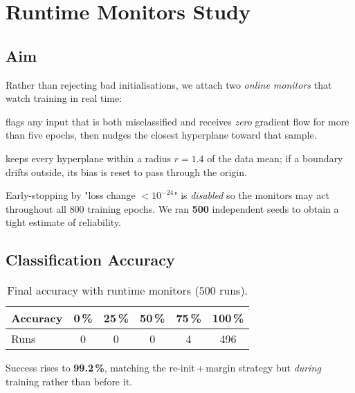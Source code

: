 \section{Runtime Monitors Study}
\label{sec:relu1-monitors}

\subsection*{Aim}
Rather than rejecting bad initialisations, we attach two \emph{online
monitors} that watch training in real time:

\begin{description}[leftmargin=2em,style=sameline]
  \item[DeadSampleMonitor] flags any input that is both misclassified
        and receives \emph{zero} gradient flow for more than five epochs,
        then nudges the closest hyperplane toward that sample.
  \item[BoundsMonitor] keeps every hyperplane within a radius
        $r = 1.4$ of the data mean; if a boundary drifts outside, its
        bias is reset to pass through the origin.
\end{description}

Early-stopping by "loss change $\!\!<\!10^{-24}$" is \emph{disabled}
so the monitors may act throughout all $800$ training epochs.
We ran \textbf{500} independent seeds to obtain a tight estimate of
reliability.

\subsection*{Classification Accuracy}

\begin{table}[h]
\centering
\caption{Final accuracy with runtime monitors ($500$ runs).}
\label{tab:relu1-monitor-accuracy}
\begin{tabular}{lccccc}
\toprule
Accuracy & 0\,\% & 25\,\% & 50\,\% & 75\,\% & 100\,\% \\
\midrule
Runs & 0 & 0 & 0 & 4 & 496 \\
\bottomrule
\end{tabular}
\end{table}

Success rises to \textbf{99.2\,\%}, matching the re-init\,+\,margin
strategy but \emph{during} training rather than before it.

